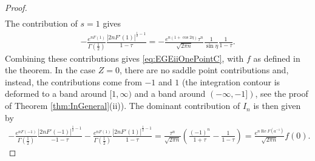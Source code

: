 \documentclass[%
 jmp,
cp,  %
 amsmath,amsthm,amssymb,%
 reprint,%
onecolumn]{revtex4-2}
\begin{document}
\begin{proof}
\begin{multline*}
\end{multline*}
The contribution of $s=1$ gives 
\begin{align*}
- \frac{e^{n F(1)}}{\Gamma\left(\frac{1}{2}\right)} \frac{|2 nF'(1)|^{\frac{1}{2}-1}}{1-\tau}
= - \frac{e^{n(1+\cos 2\eta)} \tau^n}{\sqrt{2 \pi n}} \frac{1}{\sin \eta} \frac{1}{1-\tau}.
\end{align*}
Combining these contributions gives \eqref{eq:EGEiiOnePointC}, with $f$ as defined in the theorem.  
In the case $Z=0$, there are no saddle point contributions and, instead, the contributions come from $-1$ and $1$ (the integration contour is deformed to a band around $[1,\infty)$ and a band around $(-\infty,-1])$, see the proof of Theorem \ref{thm:InGeneral}(ii)). The dominant contribution of $I_n$ is then given by
\begin{align*}
 -\frac{e^{n F(-1)}}{\Gamma\left(\frac{1}{2}\right)} \frac{|2 nF'(-1)|^{\frac{1}{2}-1}}{-1-\tau}
- \frac{e^{n F(1)}}{\Gamma\left(\frac{1}{2}\right)} \frac{|2 nF'(1)|^{\frac{1}{2}-1}}{1-\tau}
= \frac{\tau^n}{\sqrt{2\pi n}} \left(\frac{(-1)^n}{1+\tau}-\frac{1}{1-\tau}\right)
= \frac{e^{n \operatorname{Re} F(a^{-1})}}{\sqrt{2\pi n}} f(0).
\end{align*} 


\end{proof}
\end{document}
